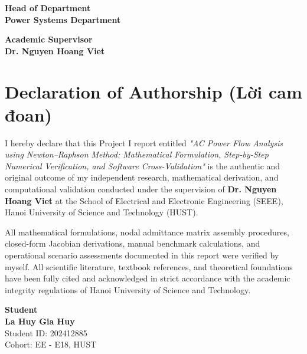 \documentclass[12pt,a4paper,oneside]{report}
\begin{document}
\vspace{30pt}
\noindent
\begin{minipage}[t]{0.45\textwidth}
    \centering
    \textbf{Head of Department}\\[50pt]
    \textbf{Power Systems Department}
\end{minipage}
\hfill
\begin{minipage}[t]{0.45\textwidth}
    \centering
    \textbf{Academic Supervisor}\\[50pt]
    \textbf{Dr. Nguyen Hoang Viet}
\end{minipage}

\clearpage

\chapter*{Declaration of Authorship (Lời cam đoan)}

I hereby declare that this Project I report entitled \textit{"AC Power Flow Analysis using Newton--Raphson Method: Mathematical Formulation, Step-by-Step Numerical Verification, and Software Cross-Validation"} is the authentic and original outcome of my independent research, mathematical derivation, and computational validation conducted under the supervision of \textbf{Dr. Nguyen Hoang Viet} at the School of Electrical and Electronic Engineering (SEEE), Hanoi University of Science and Technology (HUST).

All mathematical formulations, nodal admittance matrix assembly procedures, closed-form Jacobian derivations, manual benchmark calculations, and operational scenario assessments documented in this report were verified by myself. All scientific literature, textbook references, and theoretical foundations have been fully cited and acknowledged in strict accordance with the academic integrity regulations of Hanoi University of Science and Technology.

\vspace{40pt}
\begin{flushright}
    \textbf{Student}\\[45pt]
    \textbf{La Huy Gia Huy}\\
    Student ID: 202412885\\
    Cohort: EE - E18, HUST
\end{flushright}

\clearpage

\end{document}
